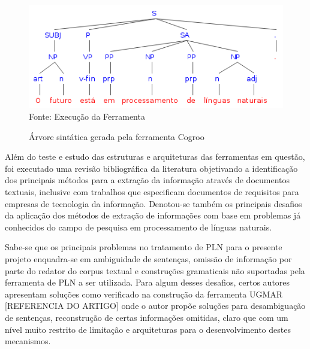 \begin{figure}[H]
\centering
\caption{Árvore sintática gerada pela ferramenta Cogroo} %
\includegraphics[scale=0.6]{stgraph}\\  %
{\small Fonte: Execução da Ferramenta} %
\label{fig:exemplo} %
\end{figure}

Além do teste e estudo das estruturas e arquiteturas das ferramentas em questão, foi executado uma revisão bibliográfica da literatura objetivando a identificação dos principais métodos para a extração da informação através de documentos textuais, inclusive com trabalhos que especificam documentos de requisitos para empresas de tecnologia da informação. Denotou-se também os principais desafios da aplicação dos métodos de extração de informações com base em problemas já conhecidos do campo de pesquisa em processamento de línguas naturais.

Sabe-se que os principais problemas no tratamento de PLN para o presente projeto enquadra-se em ambiguidade de sentenças, omissão de informação por parte do redator do corpus textual e construções gramaticais não suportadas pela ferramenta de PLN a ser utilizada. Para algum desses desafios, certos autores apresentam soluções como verificado na construção da ferramenta UGMAR [REFERENCIA DO ARTIGO] onde o autor propõe soluções para desambiguação de sentenças, reconstrução de certas informações omitidas, claro que com um nível muito restrito de limitação e arquiteturas para o desenvolvimento destes mecanismos.